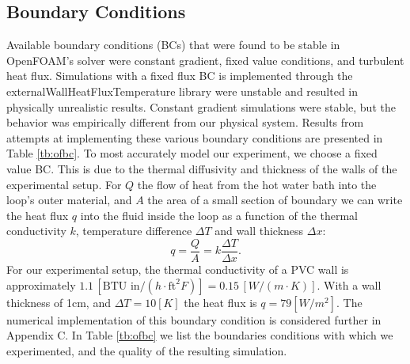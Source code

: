\documentclass[12pt]{report}
\begin{document}
\subsection{Boundary Conditions}

Available boundary conditions (BCs) that were found to be stable in OpenFOAM's solver were constant gradient, fixed value conditions, and turbulent heat flux.
Simulations with a fixed flux BC is implemented through the externalWallHeatFluxTemperature library were unstable and resulted in physically unrealistic results.
Constant gradient simulations were stable, but the behavior was empirically different from our physical system.
Results from attempts at implementing these various boundary conditions are presented in Table \ref{tb:ofbc}.
To most accurately model our experiment, we choose a fixed value BC.
This is due to the thermal diffusivity and thickness of the walls of the experimental setup.
For $Q$ the flow of heat from the hot water bath into the loop's outer material, and $A$ the area of a small section of boundary we can write the heat flux $q$ into the fluid inside the loop as a function of the thermal conductivity $k$, temperature difference $\Delta T$ and wall thickness $\Delta x$:
\begin{equation} q = \frac{Q}{A} = k \frac{\Delta T}{\Delta x} . \end{equation}
For our experimental setup, the thermal conductivity of a PVC wall is approximately $1.1 \, \left [ \text{BTU in}/(h\cdot \text{ft}^2 F) \right ]  = 0.15 \, \left [W/(m\cdot K)\right ] $.
With a wall thickness of 1cm, and $\Delta T = 10 \left [K \right ]$ the heat flux is $q=79 \left [ W/m^2 \right ]$.
The numerical implementation of this boundary condition is considered further in Appendix C.
In Table \ref{tb:ofbc} we list the boundaries conditions with which we experimented, and the quality of the resulting simulation.
\end{document}
